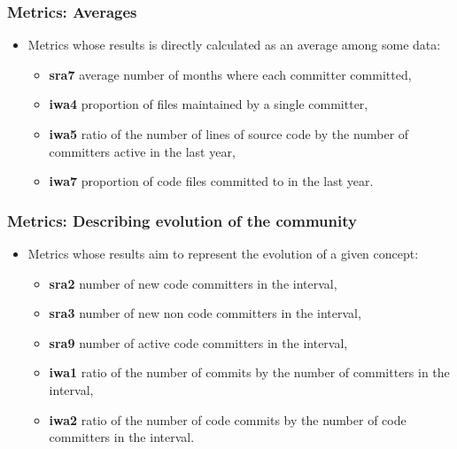 \documentclass{beamer}
\begin{document}
\begin{frame}
\frametitle{Metrics: Averages}
\begin{center}
\begin{itemize}
\item Metrics whose results is directly calculated as an average among some data:
\begin{itemize}
\item \textbf{sra7} average number of months where each committer committed,
\item \textbf{iwa4} proportion of files maintained by a single committer,
\item \textbf{iwa5} ratio of the number of lines of source code by the number of committers
active in the last year,
\item \textbf{iwa7} proportion of code files committed to in the last year.
\end{itemize}

\end{itemize}
\end{center}
\end{frame}



\begin{frame}
\frametitle{Metrics: Describing evolution of the community}
\begin{center}
\begin{itemize}
\item Metrics whose results aim to represent the evolution of a given concept:
\begin{itemize}
\item \textbf{sra2} number of new code committers in the interval,
\item \textbf{sra3} number of new non code committers in the interval,
\item \textbf{sra9} number of active code committers in the interval,
\item \textbf{iwa1} ratio of the number of commits by the number of committers in the
interval,
\item \textbf{iwa2} ratio of the number of code commits by the number of code committers
in the interval.
\end{itemize}
\end{itemize}
\end{center}
\end{frame}
\end{document}
